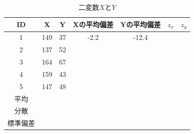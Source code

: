\documentclass{ltjbook}
\begin{document}
\begin{table}[ht]
	\centering
	\caption{二変数$X$と$Y$}
	\begin{tabular}{ccccccc}
		\hline
		ID   & X   & Y  & Xの平均偏差 & Yの平均偏差 & $z_x$ & $z_y$ \\
		\hline
		1    & 149 & 37 & -2.2   & -12.4  &       &       \\
		2    & 137 & 52 &        &        &       &       \\
		3    & 164 & 67 &        &        &       &       \\
		4    & 159 & 43 &        &        &       &       \\
		5    & 147 & 48 &        &        &       &       \\
		\hline
		平均   &     &    &        &        &       &       \\
		分散   &     &    &        &        &       &       \\
		標準偏差 &     &    &        &        &       &       \\\hline
	\end{tabular}
	\label{tbl::04_05}
\end{table}
\end{document}
